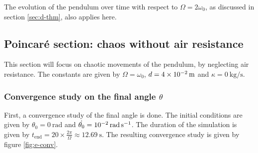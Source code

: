 \documentclass[a4paper,12pt,twoside]{article}
\begin{document}
The evolution of the pendulum over time with respect to $\Omega=2\omega_0$, as discussed in section \ref{sec:d-thm}, also applies here.


\subsection{Poincaré section: chaos without air resistance}
This section will focus on chaotic movements of the pendulum, by neglecting air resistance.
The constants are given by $\Omega = \omega_0$, $d=\SI{4d-2}{\m}$ and $\kappa=\SI{0}{\kg\per\s}$.

\subsubsection{Convergence study on the final angle $\theta$}
First, a convergence study of the final angle is done.
The initial conditions are given by $\theta_0=\SI{0}{\radian}$ and $\dot{\theta_0}=\SI{d-2}{\radian\per\second}$.
The duration of the simulation is given by $t_\text{end} = 20\times\frac{2\pi}{\Omega} \approx \SI{12.69}{\s}$.
The resulting convergence study is given by figure \ref{fig:e-conv}.
\end{document}
